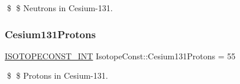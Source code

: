 \$ \$ Neutrons in Cesium-\/131. \mbox{\label{group___isotope_const-_cesium-_cs131_ga061eaac919c97f497f26388829d1c9dc}} 
\subsubsection{\texorpdfstring{Cesium131\+Protons}{Cesium131Protons}}
{\footnotesize\ttfamily \mbox{\hyperlink{group___isotope_const-_macros_ga5f18360b3e99483a35c32d789e62621c}{I\+S\+O\+T\+O\+P\+E\+C\+O\+N\+S\+T\+\_\+\+I\+NT}} Isotope\+Const\+::\+Cesium131\+Protons = 55}

\$ \$ Protons in Cesium-\/131. 